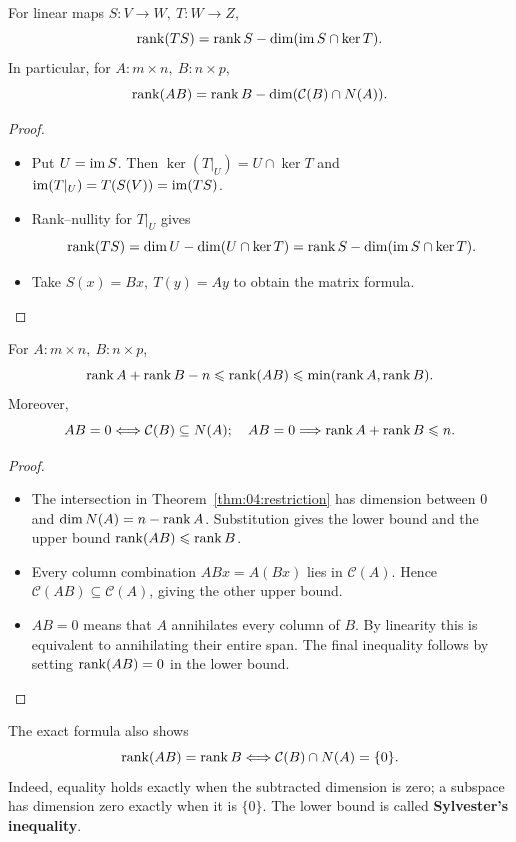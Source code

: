 \begin{theorem}\label{thm:04:restriction}
For linear maps \(S:V\to W,\ T:W\to Z\),
\[
\operatorname{rank}(TS)=\operatorname{rank} S-\dim(\operatorname{im} S\cap\ker T).
\]
In particular, for \(A:m\times n,\ B:n\times p\),
\[
\operatorname{rank}(AB)=\operatorname{rank} B-\dim(\mathcal C(B)\cap N(A)).
\]
\end{theorem}
\begin{proof}
\begin{itemize}
\item Put \(U=\operatorname{im} S\). Then
\(\ker(T|_U)=U\cap\ker T\) and
\(\operatorname{im}(T|_U)=T(S(V))=\operatorname{im}(TS)\).
\item Rank--nullity for \(T|_U\) gives
\[
\operatorname{rank}(TS)=\dim U-\dim(U\cap\ker T)
=\operatorname{rank} S-\dim(\operatorname{im} S\cap\ker T).
\]
\item Take \(S(x)=Bx,\ T(y)=Ay\) to obtain the matrix formula.
\end{itemize}
\end{proof}

\begin{proposition}\label{prop:04:bounds}
For \(A:m\times n,\ B:n\times p\),
\[
\operatorname{rank} A+\operatorname{rank} B-n
\leqslant\operatorname{rank}(AB)\leqslant\min(\operatorname{rank} A,\operatorname{rank} B).
\]
Moreover,
\[
AB=0\Longleftrightarrow\mathcal C(B)\subseteq N(A);
\quad AB=0\Longrightarrow\operatorname{rank} A+\operatorname{rank} B\leqslant n.
\]
\end{proposition}
\begin{proof}
\begin{itemize}
\item The intersection in Theorem~\ref{thm:04:restriction} has dimension
  between \(0\) and \(\dim N(A)=n-\operatorname{rank} A\). Substitution gives the
  lower bound and the upper bound \(\operatorname{rank}(AB)\leqslant\operatorname{rank} B\).
\item Every column combination \(ABx=A(Bx)\) lies in \(\mathcal C(A)\).
  Hence \(\mathcal C(AB)\subseteq\mathcal C(A)\), giving the other upper bound.
\item \(AB=0\) means that \(A\) annihilates every column of \(B\).
  By linearity this is equivalent to annihilating their entire span.
  The final inequality follows by setting \(\operatorname{rank}(AB)=0\) in the lower bound.
\end{itemize}
\end{proof}

The exact formula also shows
\[
\operatorname{rank}(AB)=\operatorname{rank} B
\Longleftrightarrow\mathcal C(B)\cap N(A)=\{0\}.
\]
Indeed, equality holds exactly when the subtracted dimension is zero;
a subspace has dimension zero exactly when it is \(\{0\}\).
The lower bound is called \textbf{Sylvester's inequality}.

